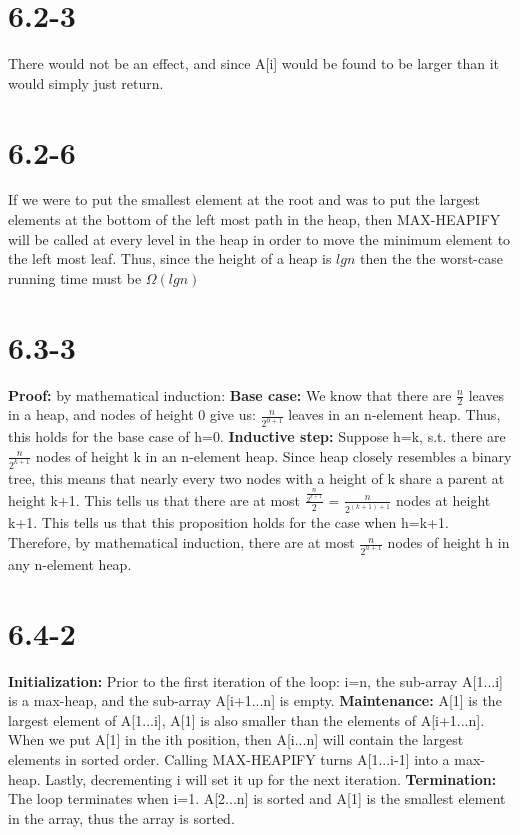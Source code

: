 \documentclass[12pt]{article}
\begin{document}
\section{6.2-3}
There would not be an effect, and since A[i] would be found to be larger than it would simply just return.

\section{6.2-6}
If we were to put the smallest element at the root and was to put the largest elements at the bottom of the left most path in the heap, then MAX-HEAPIFY will be called at every level in the heap in order to move the minimum element to the left most leaf. Thus, since the height of a heap is $lgn$ then the the worst-case running time must be $\Omega(lgn)$

\section{6.3-3}
\textbf{Proof:} by mathematical induction: \newline
\textbf{Base case:} We know that there are $\frac{n}{2}$ leaves in a heap, and nodes of height 0 give us: $\frac{n}{2^{0+1}}$ leaves in an n-element heap. Thus, this holds for the base case of h=0. \newline
\textbf{Inductive step:} Suppose h=k, s.t. there are $\frac{n}{2^{k+1}}$ nodes of height k in an n-element heap. Since heap closely resembles a binary tree, this means that nearly every two nodes with a height of k share a parent at height k+1. This tells us that there are at most $\frac{\frac{n}{2^{k+1}}}{2}$ = $\frac{n}{2^{(k+1)+1}}$ nodes at height k+1. This tells us that this proposition holds for the case when h=k+1. \newline
Therefore, by mathematical induction, there are at most $\frac{n}{2^{h+1}}$ nodes of height h in any n-element heap.

\section{6.4-2}
\textbf{Initialization:} Prior to the first iteration of the loop: i=n, the sub-array A[1...i] is a max-heap, and the sub-array A[i+1...n] is empty. \newline
\textbf{Maintenance:} A[1] is the largest element of A[1...i], A[1] is also smaller than the elements of A[i+1...n]. When we put A[1] in the ith position, then A[i...n] will contain the largest elements in sorted order. Calling MAX-HEAPIFY turns A[1...i-1] into a max-heap. Lastly, decrementing i will set it up for the next iteration. \newline
\textbf{Termination:} The loop terminates when i=1. A[2...n] is sorted and A[1] is the smallest element in the array, thus the array is sorted.
\end{document}
